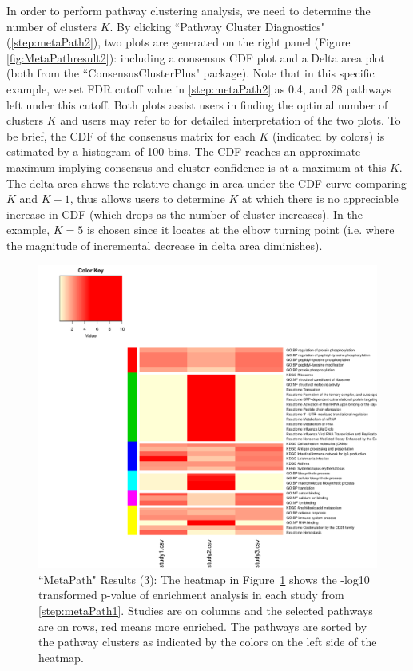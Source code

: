 In order to perform pathway clustering analysis, we need to determine the number of clusters $K$.
By clicking ``Pathway Cluster Diagnostics" (\ref{step:metaPath2}), 
two plots are generated on the right panel (Figure \ref{fig:MetaPathresult2}): 
including a consensus CDF plot and a Delta area plot (both from the ``ConsensusClusterPlus" package). 
Note that in this specific example, we set FDR cutoff value in \ref{step:metaPath2} as 0.4, 
and 28 pathways left under this cutoff.
Both plots assist users in finding the optimal number of clusters $K$ and users may refer to \cite{monti2003consensus} for detailed interpretation of the two plots. 
To be brief, the CDF of the consensus matrix for each $K$ (indicated by colors) is estimated by a histogram of 100 bins. 
The CDF reaches an approximate maximum implying consensus and cluster confidence is at a maximum at this $K$. 
The delta area shows the relative change in area under the CDF curve comparing $K$ and $K - 1$, thus allows users to determine $K$ at which there is no appreciable increase in CDF (which drops as the number of cluster increases).
In the example, $K=5$ is chosen since it locates at the elbow turning point (i.e. where the magnitude of incremental decrease in delta area diminishes).

\begin{figure}[H]
\begin{center}
\includegraphics[scale=0.6]{./figure/metaPath/Heatmap_clusters_all.pdf}
\caption{``MetaPath" Results (3):
The heatmap in Figure~\ref{fig:MetaPathresult3} shows the -log10 transformed p-value of enrichment analysis in each study from \ref{step:metaPath1}. 
Studies are on columns and the selected pathways are on rows, red means more enriched. The pathways are sorted by the pathway clusters as indicated by the colors on the left side of the heatmap.}
\label{fig:MetaPathresult3}
\end{center}
\end{figure}


